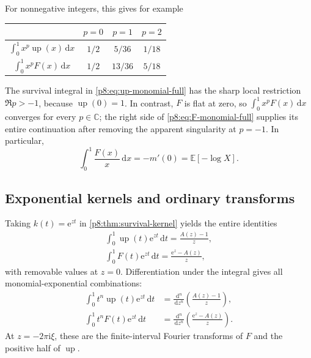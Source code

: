 \documentclass[11pt,oneside]{article}
\theoremstyle{definition}
\theoremstyle{remark}
\newcommand{\Up}{\operatorname{up}}
\newcommand{\E}{\mathbb E}
\newcommand{\C}{\mathbb C}
\newcommand{\dd}{\,\mathrm d}
\newcommand{\e}{\mathrm e}
\newcommand{\ii}{\mathrm i}
\newcommand{\1}{\mathbf 1}
\begin{document}
For nonnegative integers, this gives for example
\begin{center}
\begin{tabular}{c|ccc}
\toprule
& \(p=0\) & \(p=1\) & \(p=2\)\\
\midrule
\(\int_0^1x^p\Up(x)\dd x\)
& \(1/2\) & \(5/36\) & \(1/18\)\\
\(\int_0^1x^pF(x)\dd x\)
& \(1/2\) & \(13/36\) & \(5/18\)\\
\bottomrule
\end{tabular}
\end{center}

\begin{remark}
The survival integral in \eqref{p8:eq:up-monomial-full} has the sharp local
restriction \(\Re p>-1\), because \(\Up(0)=1\).  In contrast, \(F\) is flat at
zero, so \(\int_0^1x^pF(x)\dd x\) converges for every \(p\in\C\); the right side
of \eqref{p8:eq:F-monomial-full} supplies its entire continuation after removing
the apparent singularity at \(p=-1\).  In particular,
\begin{equation}
 \int_0^1\frac{F(x)}x\dd x=-m'(0)=\E[-\log X].
 \label{p8:eq:F-over-x}
\end{equation}
\end{remark}

\subsection{Exponential kernels and ordinary transforms}

Taking \(k(t)=\e^{zt}\) in \cref{p8:thm:survival-kernel} yields the entire
identities
\begin{align}
 \boxed{\int_0^1\Up(t)\e^{zt}\dd t=\frac{A(z)-1}{z},}
 \label{p8:eq:up-exp-transform}\\
 \boxed{\int_0^1F(t)\e^{zt}\dd t=\frac{\e^z-A(z)}{z},}
 \label{p8:eq:F-exp-transform}
\end{align}
with removable values at \(z=0\).  Differentiation under the integral gives all
monomial-exponential combinations:
\begin{align}
 \int_0^1t^n\Up(t)\e^{zt}\dd t
 &=\frac{\dd^n}{\dd z^n}\left(\frac{A(z)-1}{z}\right),
 \label{p8:eq:up-monomial-exp}\\
 \int_0^1t^nF(t)\e^{zt}\dd t
 &=\frac{\dd^n}{\dd z^n}\left(\frac{\e^z-A(z)}{z}\right).
 \label{p8:eq:F-monomial-exp}
\end{align}
At \(z=-2\pi\ii\xi\), these are the finite-interval Fourier transforms of
\(F\) and the positive half of \(\Up\).
\end{document}
